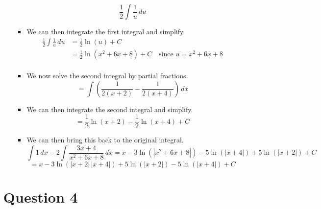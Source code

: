 \documentclass[12pt]{article}
\begin{document}
\begin{enumerate}[leftmargin=\labelsep]
\begin{enumerate}
\begin{itemize}[label={}]
            \begin{equation*}
                \frac{1}{2} \int \frac{1}{u} \, du
            \end{equation*}
            \item We can then integrate the first integral and simplify.
            \begin{equation*}
                \begin{aligned}
                    \frac{1}{2} \int \frac{1}{u} \, du &= \frac{1}{2} \ln(u) + C \\
                    &= \frac{1}{2} \ln(x^2+6x+8) + C \quad \text{since } u=x^2+6x+8 \\
                \end{aligned}
            \end{equation*}
            \item We now solve the second integral by partial fractions.
            \begin{equation*}
                = \int \left( \frac{1}{2(x+2)} - \frac{1}{2(x+4)} \right) \, dx
            \end{equation*}
            \item We can then integrate the second integral and simplify.
            \begin{equation*}
                = \frac{1}{2} \ln(x+2) - \frac{1}{2} \ln(x+4) + C
            \end{equation*}
            \item We can then bring this back to the original integral.
            \begin{equation*}
                \int 1 \, dx -2 \int \frac{3x+4}{x^2+6x+8} \, dx = x -3 \ln(|x^2+6x+8|) - 5 \ln(|x+4|) + 5 \ln(|x+2|) + C
            \end{equation*}
            \begin{equation*}
                = x -3 \ln(|x+2| \, |x+4|) + 5 \ln(|x+2|) - 5 \ln(|x+4|) + C
            \end{equation*}
        \end{itemize}
    \end{enumerate}

    \newpage

    \section*{Question 4}


\end{enumerate}
\end{document}
